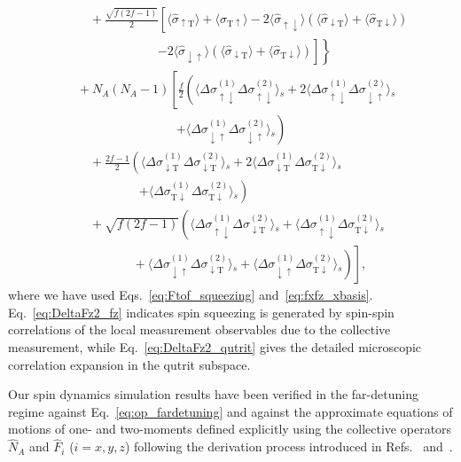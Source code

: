 \documentclass[aps,pra,twocolumn,superscriptaddress]{revtex4-1} %
\newcommand{\nn}{\nonumber}
\newcommand{\expect}[1]{\big\langle #1 \big\rangle}
\newcommand{\sigmaud}{\hat{\sigma}_{\uparrow\downarrow}}
\newcommand{\sigmaut}{\hat{\sigma}_{\uparrow \mathrm{T}}}
\newcommand{\sigmadu}{\hat{\sigma}_{\downarrow\uparrow}}
\newcommand{\sigmadt}{\hat{\sigma}_{\downarrow \mathrm{T}}}
\newcommand{\sigmatu}{\hat{\sigma}_{\mathrm{T}\uparrow}}
\newcommand{\sigmatd}{\hat{\sigma}_{\mathrm{T}\downarrow}}
\newcommand{\Dsigmaud}{\Delta\sigma_{\uparrow\downarrow}}
\newcommand{\Dsigmadu}{\Delta\sigma_{\downarrow\uparrow}}
\newcommand{\Dsigmadt}{\Delta\sigma_{\downarrow \mathrm{T}}}
\newcommand{\Dsigmatd}{\Delta\sigma_{\mathrm{T}\downarrow}}
\begin{document}
\begin{appendix}
\begin{subequations}
\begin{align}
	&\quad\quad +\! \frac{\!\sqrt{f(2f\!-\!1)}}{2}\!\left[\!\expect{\!\sigmaut\! }\!+\!\expect{\!\sigmatu\!} \!-\!2\expect{\!\sigmaud}(\expect{\!\sigmadt\!}\!+\!\expect{\!\sigmatd})\right.\nn\\
	&\quad\quad\quad\quad\quad\quad\quad \left.\phantom{\frac{1}{1}}\left.-\!2\expect{\!\sigmadu\!}(\expect{\!\sigmadt\!}\!+\!\expect{\!\sigmatd} ) \right]\! \right\}\nn\\
	&\quad +\!N_A(N_A\!-\!1)\!\left[\!\frac{f}{2}\left(\expect{\!\Dsigmaud^{(\!1\!)}\Dsigmaud^{(\!2\!)} }\!_s \!+\! 2\expect{\!\Dsigmaud^{(\!1\!)}\Dsigmadu^{(\!2\!)} }\!_s \right.\right.\nn\\
	&\quad\quad\quad\quad\quad\quad\quad\quad\quad \left.+\! \expect{\!\Dsigmadu^{(\!1\!)}\Dsigmadu^{(\!2\!)} }\!_s \right) \nn\\
	&\quad\quad +\! \frac{2f\!-\!1}{2}\left(\expect{\!\Dsigmadt^{(\!1\!)}\Dsigmadt^{(\!2\!)} }\!_s \!+\!2\expect{\!\Dsigmadt^{(\!1\!)}\Dsigmatd^{(\!2\!)} }\!_s\right. \nn\\
	&\quad\quad\quad\quad\quad\quad \left. +\!\expect{\!\Dsigmatd^{(\!1\!)}\Dsigmatd^{(\!2\!)} }\!_s\right) \nn\\
	&\quad\quad +\! \left. \sqrt{\!f(2f\!-\!1)}\left(\expect{\!\Dsigmaud^{(\!1\!)}\Dsigmadt^{(\!2\!)} }\!_s \!+\!\expect{\!\Dsigmaud^{(\!1\!)}\Dsigmatd^{(\!2\!)} }\!_s\right.\right.\nn\\ &\quad\quad\quad\quad\quad\left.\phantom{\frac{1}{1}}\left.\!+\!\expect{\!\Dsigmadu^{(\!1\!)}\Dsigmadt^{(\!2\!)} }\!_s\!+\!\expect{\!\Dsigmadu^{(\!1\!)}\Dsigmatd^{(\!2\!)} }\!_s \right)\!\right]\!,\label{eq:DeltaFz2_qutrit}
	\end{align}
\end{subequations}
where we have used Eqs.~\eqref{eq:Ftof_squeezing} and~\eqref{eq:fxfz_xbasis}. Eq.~\eqref{eq:DeltaFz2_fz} indicates spin squeezing is generated by spin-spin correlations of the local measurement observables due to the collective measurement, while Eq.~\eqref{eq:DeltaFz2_qutrit} gives the detailed microscopic correlation expansion in the qutrit subspace.

Our spin dynamics simulation results have been verified in the far-detuning regime against Eq.~\eqref{eq:op_fardetuning} and against the approximate equations of motions of one- and two-moments defined explicitly using the collective operators $ \hat{N}_A $ and $ \hat{F}_i $ ($ i=x,y,z $) following the derivation process introduced in Refs.~\cite{Qi2016} and~\cite{Norris2014}.



\end{appendix}
\end{document}
